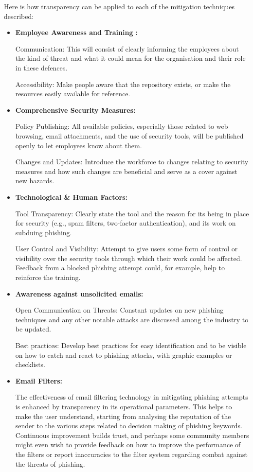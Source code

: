 Here is how transparency can be applied to each of the mitigation techniques described:
\begin{itemize}
    \item \textbf{Employee Awareness and Training :} 
    
    Communication: This will consist of clearly informing the employees about the kind of threat and what it could mean for the organisation and their role in these defences.
    
    Accessibility: Make people aware that the repository exists, or make the resources easily available for reference. 

     \item \textbf{Comprehensive Security Measures: }
     
     Policy Publishing: All available policies, especially those related to web browsing, email attachments, and the use of security tools, will be published openly to let employees know about them.
     

    Changes and Updates: Introduce the workforce to changes relating to security measures and how such changes are beneficial and serve as a cover against new hazards.

     \item \textbf{Technological \& Human Factors: } 
     
     Tool Transparency: Clearly state the tool and the reason for its being in place for security (e.g., spam filters, two-factor authentication), and its work on subduing phishing. 
     
    User Control and Visibility: Attempt to give users some form of control or visibility over the security tools through which their work could be affected. Feedback from a blocked phishing attempt could, for example, help to reinforce the training.

     \item \textbf{Awareness against unsolicited emails:  } 
     
     Open Communication on Threats: Constant updates on new phishing techniques and any other notable attacks are discussed among the industry to be updated.
     
    Best practices: Develop best practices for easy identification and to be visible on how to catch and react to phishing attacks, with graphic examples or checklists.

    \item \textbf{Email Filters:} 

    The effectiveness of email filtering technology in mitigating phishing attempts is enhanced by transparency in its operational parameters. This helps to make the user understand, starting from analysing the reputation of the sender to the various steps related to decision making of phishing keywords. Continuous improvement builds trust, and perhaps some community members might even wish to provide feedback on how to improve the performance of the filters or report inaccuracies to the filter system regarding combat against the threats of phishing.


\end{itemize}
